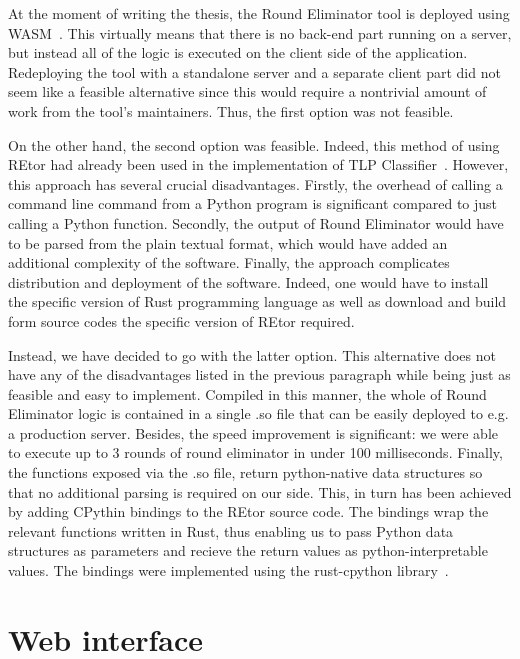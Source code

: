At the moment of writing the thesis, the Round Eliminator tool
is deployed using WASM~\cite{WASM}. This virtually means that
there is no back-end part running on a server, but instead
all of the logic is executed on the client side of the application.
Redeploying the tool with a standalone server and a separate client
part did not seem like a feasible alternative since this would
require a nontrivial amount of work from the tool's maintainers.
Thus, the first option was not feasible.

On the other hand, the second option was feasible. Indeed,
this method of using REtor had already been used in the
implementation of TLP Classifier~\cite{Rocher2020clas}. However,
this approach has several crucial disadvantages.
Firstly, the overhead of calling a command line command
from a Python program is significant compared to just calling
a Python function. Secondly, the output of Round Eliminator
would have to be parsed from the plain textual format, which
would have added an additional complexity of the software.
Finally, the approach complicates distribution and deployment of
the software. Indeed, one would have to install the specific
version of Rust programming language as well as download and
build form source codes the specific version of REtor required.

Instead, we have decided to go with the latter option. This
alternative does not have any of the disadvantages listed
in the previous paragraph while being just as feasible and
easy to implement. Compiled in this manner, the whole of
Round Eliminator logic is contained in a single .so file
that can be easily deployed to e.g. a production server.
Besides, the speed improvement is significant: we were
able to execute up to 3 rounds of round eliminator
in under 100 milliseconds. Finally, the functions
exposed via the .so file, return python-native
data structures so that no additional parsing is required on our side.
This, in turn has been achieved by adding CPythin bindings
to the REtor source code. The bindings wrap the relevant functions
written in Rust, thus enabling us to pass Python data structures
as parameters and recieve the return values as python-interpretable values.
The bindings were implemented using the rust-cpython library~\cite{RustCPython}.


\section{Web interface}
\label{section:webinterface}


